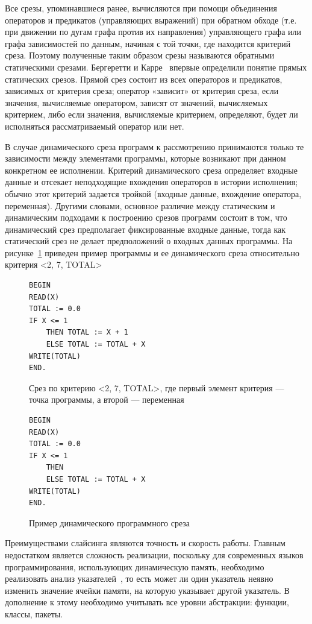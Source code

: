 Все срезы, упоминавшиеся ранее, вычисляются при помощи объединения операторов и предикатов (управляющих выражений) при обратном обходе (т.е. при движении по дугам графа против их направления) управляющего графа или графа зависимостей по данным, начиная с той точки, где находится критерий среза. Поэтому полученные таким образом срезы называются обратными статическими срезами.   Бергеретти и Карре~\cite{bergeretti1985information} впервые определили понятие прямых статических срезов. Прямой срез состоит из всех операторов и предикатов, зависимых от критерия среза; оператор «зависит» от критерия среза, если значения, вычисляемые оператором, зависят от значений, вычисляемых критерием, либо если значения, вычисляемые критерием, определяют, будет ли исполняться рассматриваемый оператор или нет. 

В случае динамического среза программ к рассмотрению принимаются только те зависимости между элементами программы, которые возникают при данном конкретном ее исполнении. Критерий динамического среза определяет входные данные и отсекает неподходящие вхождения операторов в истории исполнения; обычно этот критерий задается тройкой (входные данные, вхождение оператора, переменная). Другими словами, основное различие между статическим и динамическим подходами к построению срезов программ состоит в том, что динамический срез предполагает фиксированные входные данные, тогда как статический срез не делает предположений о входных данных программы. На рисунке~\ref{ex:dynslice} приведен пример программы и ее динамического среза относительно критерия <2, 7, {TOTAL}>
\begin{figure}[]
\begin{lstlisting}
BEGIN
READ(X)
TOTAL := 0.0
IF X <= 1
	THEN TOTAL := X + 1
	ELSE TOTAL := TOTAL + X
WRITE(TOTAL)
END.
\end{lstlisting}
Срез по критерию <2, 7, {TOTAL}>, где первый элемент критерия --- точка программы, а второй --- переменная
\begin{lstlisting}
BEGIN
READ(X)
TOTAL := 0.0
IF X <= 1
	THEN
	ELSE TOTAL := TOTAL + X
WRITE(TOTAL)
END.
\end{lstlisting}
\caption{Пример динамического программного среза}
\label{ex:dynslice}
\end{figure}

Преимуществами слайсинга являются точность и скорость работы. Главным недостатком является сложность реализации, поскольку для современных языков программирования, использующих динамическую память, необходимо реализовать анализ указателей~\cite{deutsch1994interprocedural}, то есть может ли один указатель неявно изменить значение ячейки памяти, на которую указывает другой указатель. В дополнение к этому необходимо учитывать все уровни абстракции: функции, классы, пакеты. 

